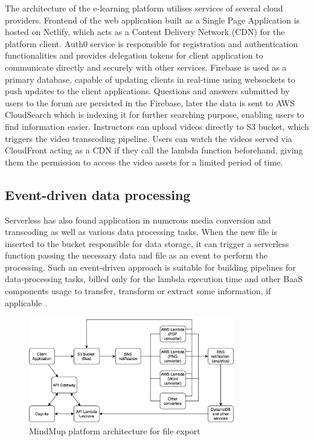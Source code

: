 The architecture of the e-learning platform utilises services of several cloud providers. Frontend of the web application built as a Single Page Application is hosted on Netlify, which acts as a Content Delivery Network (CDN) for the platform client. Auth0 service is responsible for registration and authentication functionalities and provides delegation tokens for client application to communicate directly and securely with other services. Firebase is used as a primary database, capable of updating clients in real-time using websockets to push updates to the client applications. Questions and answers submitted by users to the forum are persisted in the Firebase, later the data is sent to AWS CloudSearch which is indexing it for further searching purpose, enabling users to find information easier. Instructors can upload videos directly to S3 bucket, which triggers the video transcoding pipeline. Users can watch the videos served via CloudFront acting as a CDN if they call the lambda function beforehand, giving them the permission to access the video assets for a limited period of time.

\subsection{Event-driven data processing}


Serverless has also found application in numerous media conversion and transcoding as well as various data processing tasks. When the new file is inserted to the bucket responsible for data storage, it can trigger a serverless function passing the necessary data and file as an event to perform the processing. Such an event-driven approach is suitable for building pipelines for data-processing tasks, billed only for the lambda execution time and other BaaS components usage to transfer, transform or extract some information, if applicable \cite{ServerlessArchitectureOnAWS}.

\begin{figure}[h]
    \centering
    \includegraphics[width=0.8\textwidth]{assets/02-serverless/MindMupArchitecture.png}
    \caption{MindMup platform architecture for file export}
    \label{fig:mindmup-architecture-diagram}
\end{figure}

